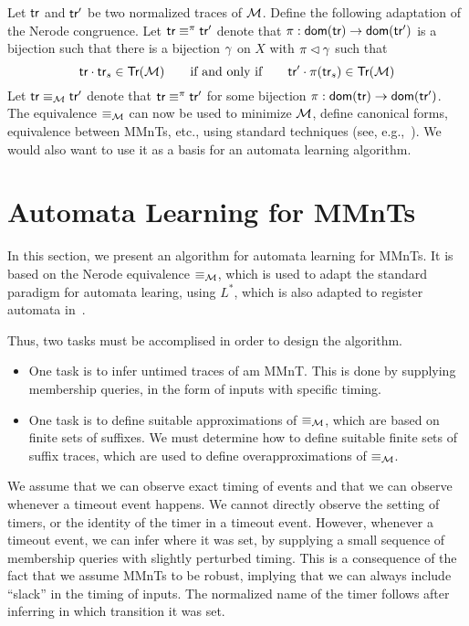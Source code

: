 Let $\textsf{tr}$ and $\textsf{tr}'$ be two normalized traces of ${\cal M}$.  Define the
following adaptation of the Nerode congruence.
Let $\textsf{tr} \equiv^{\pi} \textsf{tr}'$ denote that
$\pi: {\textsf{dom}}(\textsf{tr}) \rightarrow {\textsf{dom}}(\textsf{tr}')$ is a bijection
such that there is a bijection $\gamma$ on $X$ with
$\pi \lhd\gamma$ such that
\[
\textsf{tr}\cdot \textsf{tr}_s \in \textsf{Tr}({\cal M})
\qquad \mbox{if and only if} \qquad
\textsf{tr}'\cdot \pi(\textsf{tr}_s) \in \textsf{Tr}({\cal M})
\]
Let $\textsf{tr} \equiv_{{\cal M}} \textsf{tr}'$ denote that 
$\textsf{tr} \equiv^{\pi} \textsf{tr}'$ for some bijection
$\pi: {\textsf{dom}}(\textsf{tr}) \rightarrow {\textsf{dom}}(\textsf{tr}')$.
The equivalence $\equiv_{{\cal M}}$ can now be used to minimize ${\cal M}$, define
canonical forms, equivalence between MMnTs, etc., using standard techniques
(see, e.g.,~\cite{LeeY96}).
We would also want to use it as a basis for an automata learning algorithm.

\section{Automata Learning for MMnTs}
In this section, we present an algorithm for automata learning for MMnTs.
It is based on the Nerode equivalence $\equiv_{{\cal M}}$, which is used to adapt
the standard paradigm for automata learing, using $L^*$, which is also adapted
to register automata in~\cite{CasselHJS16}. 

Thus, two tasks must be accomplised in order to design the algorithm.
\begin{itemize}
  \item
    One task is to infer untimed traces of am MMnT.
    This is done by supplying membership queries, in the form of inputs
    with specific timing.
\item
  One task is to define suitable approximations of $\equiv_{\cal M}$, which are
  based on finite sets of suffixes. We must determine how to define suitable
  finite sets of suffix traces, which are used to define overapproximations
  of $\equiv_{\cal M}$.
\end{itemize}
We assume that we can observe
exact timing of events and that we can observe whenever a timeout event
happens. We cannot directly observe the setting of timers, or the identity
of the timer in a timeout event. However, whenever a timeout event, we
can infer where it was set, by supplying a small sequence of membership queries
with slightly perturbed timing. This is a consequence of the fact that we
assume MMnTs to be robust, implying that we can always include ``slack'' in
the timing of inputs. The normalized name of the timer follows after inferring
in which transition it was set.

